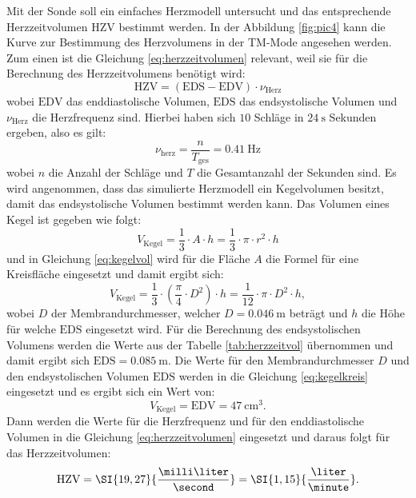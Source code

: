 Mit der Sonde soll ein einfaches Herzmodell untersucht und das entsprechende Herzzeitvolumen $\text{HZV}$ bestimmt werden. In der Abbildung \ref{fig:pic4} kann die Kurve zur Bestimmung des Herzvolumens in der TM-Mode angesehen werden. Zum einen ist die Gleichung \ref{eq:herzzeitvolumen} relevant, weil sie für die Berechnung des Herzzeitvolumens benötigt wird:
\begin{equation}
\label{eq:herzzeitvolumen}
\text{HZV} = (\text{EDS}-\text{EDV}) \cdot \nu_\text{Herz}
\end{equation}
wobei $\text{EDV}$ das enddiastolische Volumen, $\text{EDS}$ das endsystolische Volumen und $\nu_\text{Herz}$ die Herzfrequenz sind. Hierbei haben sich $10$ Schläge in $\SI{24}{\second}$ Sekunden ergeben, also es gilt:
\begin{equation*}
\label{eq:herzfreq}
\nu_\text{herz} = \frac{n}{T_\text{ges}} = \SI{0,41}{\hertz}
\end{equation*}
wobei $n$ die Anzahl der Schläge und $T$ die Gesamtanzahl der Sekunden sind. Es wird angenommen, dass das simulierte Herzmodell ein Kegelvolumen\cite{Kegelvolumen} besitzt, damit das endsystolische Volumen bestimmt werden kann. Das Volumen eines Kegel ist gegeben wie folgt:
\begin{equation}
\label{eq:kegelvol}
V_\text{Kegel} = \frac{1}{3} \cdot A \cdot h = \frac{1}{3} \cdot \pi \cdot r^{2} \cdot h 
\end{equation}
und in Gleichung \ref{eq:kegelvol} wird für die Fläche $A$ die Formel für eine Kreisfläche eingesetzt und damit ergibt sich:
\begin{equation}
\label{eq:kegelkreis}
V_\text{Kegel} = \frac{1}{3} \cdot (\frac{\pi}{4} \cdot D^{2}) \cdot h =  \frac{1}{12} \cdot \pi \cdot D^{2} \cdot h,
\end{equation}
wobei $D$ der Membrandurchmesser, welcher $D = \SI{0,046}{\meter}$ beträgt und $h$ die Höhe für welche $\text{EDS}$ eingesetzt wird. Für die Berechnung des endsystolischen Volumens werden die Werte aus der Tabelle \ref{tab:herzzeitvol} übernommen und damit ergibt sich $\text{EDS} = \SI{0,085}{\meter}$. Die Werte für den Membrandurchmesser $D$ und den endsystolischen Volumen $\text{EDS}$ werden in die Gleichung \ref{eq:kegelkreis} eingesetzt und es ergibt sich ein Wert von:
\begin{equation*}
V_\text{Kegel} = \text{EDV} = \SI{47}{\cubic\cm}.
\end{equation*}
Dann werden die Werte für die Herzfrequenz und für den enddiastolische Volumen in die Gleichung \ref{eq:herzzeitvolumen} eingesetzt und daraus folgt für das Herzzeitvolumen:
\begin{equation*}
\text{HZV} = \SI{19,27}{\frac{\milli\liter}{\second}} = \SI{1,15}{\frac{\liter}{\minute}}.
\end{equation*}

